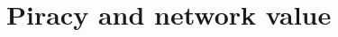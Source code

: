 \documentclass[12pt,twoside]{report}
\makeatletter
\numberwithin{equation}{section}
\newcommand{\chapterauthor}[1]{%
  {\parindent0pt\vspace*{-25pt}%
  \linespread{1.1}\large\scshape#1%
  \par\nobreak\vspace*{35pt}}
  \@afterheading%
}
\makeatother
\begin{document}
\chapter{Piracy and network value}


% 

% 

\end{document}
